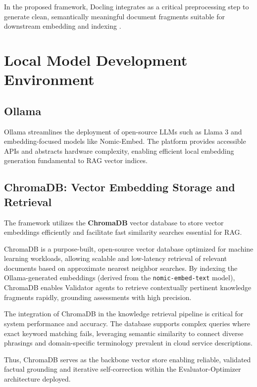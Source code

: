 In the proposed framework, Docling integrates as a critical preprocessing step to generate clean, semantically meaningful document fragments suitable for downstream embedding and indexing \cite{docling2024web}.

\section{Local Model Development Environment}

\subsection{Ollama}

Ollama \cite{ollama2024web} streamlines the deployment of open-source LLMs such as Llama 3 and embedding-focused models like Nomic-Embed. The platform provides accessible APIs and abstracts hardware complexity, enabling efficient local embedding generation fundamental to RAG vector indices.

\subsection{ChromaDB: Vector Embedding Storage and Retrieval}

The framework utilizes the \textbf{ChromaDB} vector database \cite{chromadb2024} to store vector embeddings efficiently and facilitate fast similarity searches essential for RAG.

ChromaDB is a purpose-built, open-source vector database optimized for machine learning workloads, allowing scalable and low-latency retrieval of relevant documents based on approximate nearest neighbor searches. By indexing the Ollama-generated embeddings (derived from the \texttt{nomic-embed-text} model), ChromaDB enables Validator agents to retrieve contextually pertinent knowledge fragments rapidly, grounding assessments with high precision.

The integration of ChromaDB in the knowledge retrieval pipeline is critical for system performance and accuracy. The database supports complex queries where exact keyword matching fails, leveraging semantic similarity to connect diverse phrasings and domain-specific terminology prevalent in cloud service descriptions.

Thus, ChromaDB serves as the backbone vector store enabling reliable, validated factual grounding and iterative self-correction within the Evaluator-Optimizer architecture deployed.

